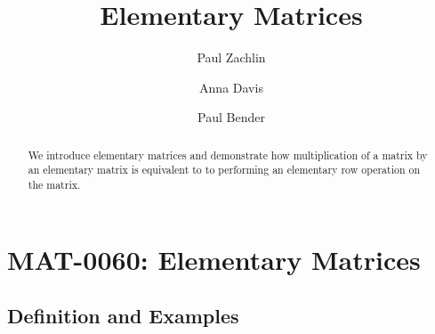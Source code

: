 \documentclass{ximera}
\author{Paul Zachlin \and Anna Davis \and Paul Bender} \title{Elementary Matrices} \license{CC-BY 4.0}
\begin{document}
\begin{abstract}
 We introduce elementary matrices and demonstrate how multiplication of a matrix by an elementary matrix is equivalent to to performing an elementary row operation on the matrix.
\end{abstract}
\maketitle

\section*{MAT-0060: Elementary Matrices}
\subsection*{Definition and Examples}
\end{document}
